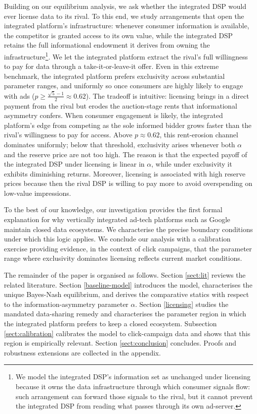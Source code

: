 \noindent Building on our equilibrium analysis, we ask whether the integrated DSP would ever license data to its rival. To this end, we study arrangements that open the integrated platform's infrastructure: whenever consumer information is available, the competitor is granted access to its own value, while the integrated DSP retains the full informational endowment it derives from owning the infrastructure\footnote{We model the integrated DSP's information set as unchanged under licensing because it owns the data infrastructure through which consumer signals flow: such arrangement can forward those signals to the rival, but it cannot prevent the integrated DSP from reading what passes through its own ad-server.}. We let the integrated platform extract the rival's full willingness to pay for data through a take-it-or-leave-it offer. Even in this extreme benchmark, the integrated platform prefers exclusivity across substantial parameter ranges, and uniformly so once consumers are highly likely to engage with ads ($p \geq \frac{\sqrt{5}-1}{2} \approx 0.62$). The tradeoff is intuitive: licensing brings in a direct payment from the rival but erodes the auction-stage rents that informational asymmetry confers. When consumer engagement is likely, the integrated platform's edge from competing as the sole informed bidder grows faster than the rival's willingness to pay for access. Above $ p \approx 0.62 $, this rent-erosion channel dominates uniformly; below that threshold, exclusivity arises whenever both $ \alpha $ and the reserve price are not too high. The reason is that the expected payoff of the integrated DSP under licensing is linear in $ \alpha $, while under exclusivity it exhibits diminishing returns. Moreover, licensing is associated with high reserve prices because then the rival DSP is willing to pay more to avoid overspending on low-value impressions.

To the best of our knowledge, our investigation provides the first formal explanation for why vertically integrated ad-tech platforms such as Google maintain closed data ecosystems. We characterise the precise boundary conditions under which this logic applies. We conclude our analysis with a calibration exercise providing evidence, in the context of click campaigns, that the parameter range where exclusivity dominates licensing reflects current market conditions.

\noindent The remainder of the paper is organised as follows. Section \ref{sect:lit} reviews the related literature. Section \ref{baseline-model} introduces the model, characterises the unique Bayes-Nash equilibrium, and derives the comparative statics with respect to the information-asymmetry parameter $\alpha$. Section \ref{licensing} studies the mandated data-sharing remedy and characterises the parameter region in which the integrated platform prefers to keep a closed ecosystem. Subsection \ref{sect:calibration} calibrates the model to click-campaign data and shows that this region is empirically relevant. Section \ref{sect:conclusion} concludes. Proofs and robustness extensions are collected in the appendix.

